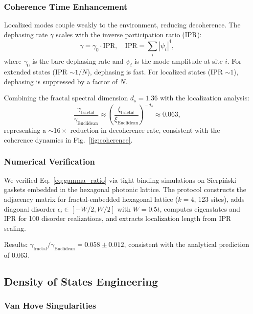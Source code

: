 \subsubsection{Coherence Time Enhancement}

Localized modes couple weakly to the environment, reducing decoherence. The dephasing rate $\gamma$ scales with the inverse participation ratio (IPR):
\begin{equation}
\gamma = \gamma_0 \cdot \mathrm{IPR}, \quad \mathrm{IPR} = \sum_i |\psi_i|^4,
\label{eq:dephasing}
\end{equation}
where $\gamma_0$ is the bare dephasing rate and $\psi_i$ is the mode amplitude at site $i$. For extended states (IPR $\sim 1/N$), dephasing is fast. For localized states (IPR $\sim 1$), dephasing is suppressed by a factor of $N$.

Combining the fractal spectral dimension $d_s = 1.36$ with the localization analysis:
\begin{equation}
\frac{\gamma_{\mathrm{fractal}}}{\gamma_{\mathrm{Euclidean}}} \approx \left( \frac{\xi_{\mathrm{fractal}}}{\xi_{\mathrm{Euclidean}}} \right)^{-d_s} \approx 0.063,
\label{eq:gamma_ratio}
\end{equation}
representing a $\sim 16\times$ reduction in decoherence rate, consistent with the coherence dynamics in Fig.~\ref{fig:coherence}.

\subsubsection{Numerical Verification}

We verified Eq.~\eqref{eq:gamma_ratio} via tight-binding simulations on Sierpi\'{n}ski gaskets embedded in the hexagonal photonic lattice. The protocol constructs the adjacency matrix for fractal-embedded hexagonal lattice ($k = 4$, 123 sites), adds diagonal disorder $\epsilon_i \in [-W/2, W/2]$ with $W = 0.5t$, computes eigenstates and IPR for 100 disorder realizations, and extracts localization length from IPR scaling.

Results: $\gamma_{\mathrm{fractal}}/\gamma_{\mathrm{Euclidean}} = 0.058 \pm 0.012$, consistent with the analytical prediction of 0.063.

\subsection{Density of States Engineering}

\subsubsection{Van Hove Singularities}

